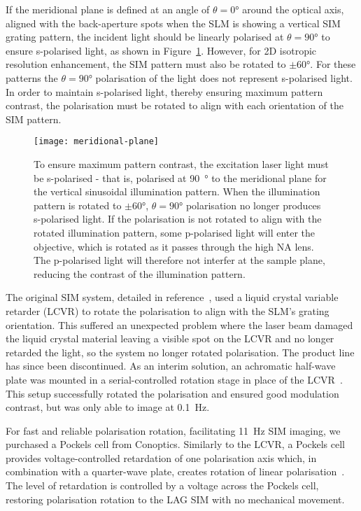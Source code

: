 If the meridional plane is defined at an angle of $\theta=0\si{\degree}$ around the optical axis, aligned with the back-aperture spots when the SLM is showing a vertical SIM grating pattern, the incident light should be linearly polarised at $\theta=90\si{\degree}$ to ensure s-polarised light, as shown in Figure~\ref{fig:meridional-plane}. 
However, for 2D isotropic resolution enhancement, the SIM pattern must also be rotated to $\pm60\si{\degree}$. 
For these patterns the $\theta=90\si{\degree}$ polarisation of the light does not represent s-polarised light. 
In order to maintain s-polarised light, thereby ensuring maximum pattern contrast, the polarisation must be rotated to align with each orientation of the SIM pattern. 

\begin{figure}[tbp]
\centering
\texttt{[image: meridional-plane]}
\caption[LAG SIM: Laser polarisation must be perpendicular to the sinusoidal illumination for high pattern contrast]{To ensure maximum pattern contrast, the excitation laser light must be s-polarised - that is, polarised at \SI{90}{\degree} to the meridional plane for the vertical sinusoidal illumination pattern. When the illumination pattern is rotated to $\pm60\si{\degree}$, $\theta=90\si{\degree}$ polarisation no longer produces s-polarised light. If the polarisation is not rotated to align with the rotated illumination pattern, some p-polarised light will enter the objective, which is rotated as it passes through the high NA lens. The p-polarised light will therefore not interfer at the sample plane, reducing the contrast of the illumination pattern.} \label{fig:meridional-plane}
\end{figure}

The original SIM system, detailed in reference~\cite{young2016guide}, used a liquid crystal variable retarder (LCVR) to rotate the polarisation to align with the SLM's grating orientation. 
This suffered an unexpected problem where the laser beam damaged the liquid crystal material leaving a visible spot on the LCVR and no longer retarded the light, so the system no longer rotated polarisation. 
The product line has since been discontinued.
As an interim solution, an achromatic half-wave plate was mounted in a serial-controlled rotation stage in place of the LCVR~\cite[\textit{ch. 8}]{hecht2017optics}. 
This setup successfully rotated the polarisation and ensured good modulation contrast, but was only able to image at \SI{0.1}{\hertz}. 

For fast and reliable polarisation rotation, facilitating \SI{11}{\hertz} SIM imaging, we purchased a Pockels cell from Conoptics. 
Similarly to the LCVR, a Pockels cell provides voltage-controlled retardation of one polarisation axis which, in combination with a quarter-wave plate, creates rotation of linear polarisation~\cite[\textit{ch. 8}]{hecht2017optics}.
The level of retardation is controlled by a voltage across the Pockels cell, restoring polarisation rotation to the LAG SIM with no mechanical movement. 

